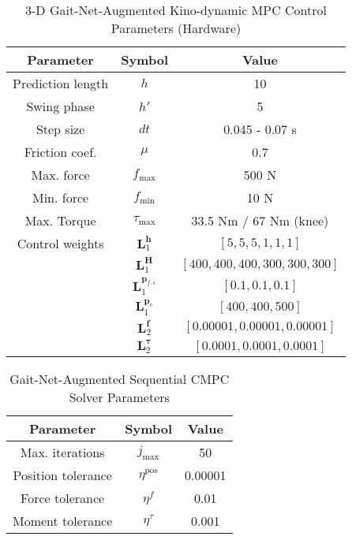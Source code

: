\begin{table}[H]
	\vspace{0.2cm}
	\centering
	\caption{3-D Gait-Net-Augmented Kino-dynamic MPC Control Parameters (Hardware)}
	\begin{tabular}{ccc}
	\hline
	Parameter & Symbol & Value \\
	\hline
	Prediction length & $h$  &  10 \\
        Swing phase & $h'$ & 5 \\
        Step size & $dt$  &  0.045 - 0.07 s \\
        Friction coef. & $\mu$  &  0.7 \\
        Max. force & $f_\text{max}$  &  500 N \\
        Min. force & $f_\text{min}$  &  10 N \\
        Max. Torque & $\tau_\text{max}$ & 33.5 Nm / 67 Nm (knee)\\
        Control weights & $\bm L_1^{\bm h}$  &  $[5, 5, 5, 1, 1, 1]$ \\
        & $\bm L_1^{\bm H}$  &  $[400, 400, 400, 300, 300, 300]$ \\
        & $\bm L_1^{\bm p_{f,i}}$ & $[0.1, 0.1, 0.1]$ \\
        & $\bm L_1^{\bm p_{c}}$ & $[400, 400, 500]$ \\
        & $\bm L_2^{\bm f}$ & $[0.00001, 0.00001, 0.00001]$ \\
        & $\bm L_2^{\bm \tau}$ & $[0.0001, 0.0001, 0.0001]$ \\
	\hline 
	\end{tabular}
	\vspace{0.2cm}
\end{table}	

\begin{table}[H]
	\vspace{0.2cm}
	\centering
	\caption{Gait-Net-Augmented Sequential CMPC Solver Parameters}
	\begin{tabular}{ccc}
	\hline
	Parameter & Symbol & Value \\
	\hline
	Max. iterations & $j_\text{max}$  &  50 \\
        Position tolerance & $\eta^\text{pos}$ & 0.00001 \\
        Force tolerance & $\eta^{f}$  &  0.01 \\
        Moment tolerance & $\eta^\tau$  &  0.001 \\
	\hline 
	\end{tabular}
	\vspace{0.2cm}
\end{table}	
